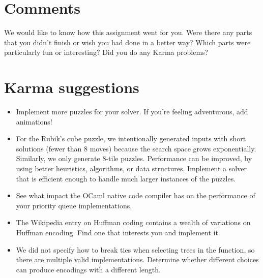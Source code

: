 \documentclass{pset}
\begin{document}
\section*{Comments}

We would like to know how this assignment went for you.  Were there
any parts that you didn't finish or wish you had done in a better way?
Which parts were particularly fun or interesting?  Did you do any
Karma problems?

\section*{Karma suggestions}

\begin{itemize}
\item Implement more puzzles for your solver.  If you're feeling
  adventurous, add animations!

\item For the Rubik's cube puzzle, we intentionally generated inputs
  with short solutions (fewer than 8 moves) because the search space
  grows exponentially. Similarly, we only generate 8-tile puzzles.
  Performance can be improved, by using better heuristics, algorithms,
  or data structures.  Implement a solver that is efficient enough to
  handle much larger instances of the puzzles.

\item See what impact the OCaml native code compiler 
  has on the performance of your priority queue implementations. 

\item The Wikipedia entry on Huffman coding contains a wealth of
  variations on Huffman encoding.  Find one that interests you and
  implement it.

\item We did not specify how to break ties when selecting trees in the
   function, so there are multiple valid
  implementations.  Determine whether different choices can produce
  encodings with a different length.
\end{itemize}
\end{document}
